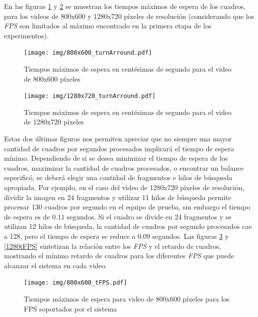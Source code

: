 En las figuras \ref{800turnArround} y \ref{1280turnArround} se muestran los
tiempos máximos de espera de los cuadros, para los videos de 800x600 y 1280x720
píxeles de resolución (considerando que los \emph{FPS} son limitados al máximo
encontrado en la primera etapa de los experimentos).

\begin{figure}[!htb]

	\texttt{[image: img/800x600\_turnArround.pdf]}
	\caption{Tiempos máximos de espera en centésimas de segundo para el
	video de 800x600 píxeles}
	\label{800turnArround}

\end{figure}


\begin{figure}[!htb]

	\texttt{[image: img/1280x720\_turnArround.pdf]}
	\caption{Tiempos máximos de espera en centésimas de segundo para el
	video de 1280x720 píxeles}
	\label{1280turnArround}

\end{figure}

Estas dos últimas figuras nos permiten apreciar que no siempre una mayor
cantidad de cuadros por segundos procesados implicará el tiempo de espera
mínimo. Dependiendo de si se desea minimizar el tiempo de espera de los cuadros,
maximizar la cantidad de cuadros procesados, o encontrar un balance especificó,
se deberá elegir una cantidad de fragmentos e hilos de búsqueda apropiada. Por
ejemplo, en el caso del video de 1280x720 píxeles de resolución, dividir la
imagen en 24 fragmentos y utilizar 11 hilos de búsqueda permite procesar 130
cuadros por segundo en el equipo de prueba, sin embargo el tiempo de espera es
de $0.11$ segundos. Si el cuadro se divide en 24 fragmentos y se utilizan 12
hilos de búsqueda, la cantidad de cuadros por segundo procesados cae a 128, pero
el tiempo de espera se reduce a $0.09$ segundos. Las figuras \ref{800tFPS} y
\ref{1280tFPS} sintetizan la relación entre los \emph{FPS} y el retardo de
cuadros, mostrando el mínimo retardo de cuadros para los diferentes \emph{FPS}
que puede alcanzar el sistema en cada video.

\begin{figure}[!htb]

	\texttt{[image: img/800x600\_tFPS.pdf]}
	\caption{Tiempos máximos de espera para video de 800x600 píxeles para
	los FPS soportados por el sistema}
	\label{800tFPS}

\end{figure}

